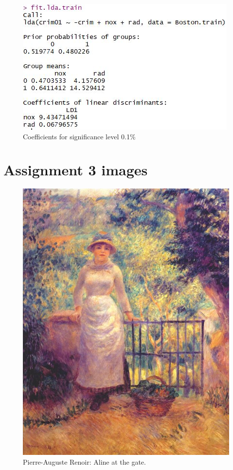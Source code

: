 \begin{figure}[H]
\centering
\includegraphics[scale=0.55]{Graphics/Assignment1/LDACoefficients_0001.JPG}
\caption{Coefficients for significance level 0.1\%}
\label{fig:coefficients_method_0001}
\end{figure}


\section{Assignment 3 images}
\begin{figure}[H]
    \centering
    \includegraphics[scale=0.3]{Graphics/Assignment3/renoir.png}
    \caption{Pierre-Auguste Renoir: Aline at the gate.}
    \label{fig:renoir}
\end{figure}

